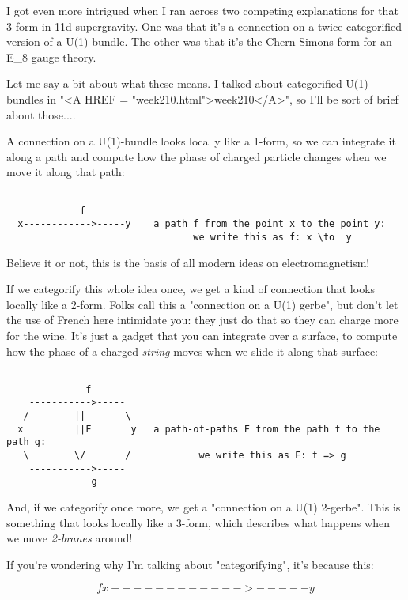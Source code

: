I got even more intrigued when I ran across two competing 
explanations for that 3-form in 11d supergravity.  One was 
that it's a connection on a twice categorified version of 
a U(1) bundle.  The other was that it's the Chern-Simons
form for an E_{8} gauge theory. 

Let me say a bit about what these means.  I talked about categorified
U(1) bundles in "<A HREF = "week210.html">week210</A>", so
I'll be sort of brief about those....

A connection on a U(1)-bundle looks locally like a 1-form, 
so we can integrate it along a path and compute how the 
phase of charged particle changes when we move it along that 
path:


\begin{verbatim}

             f
  x------------>-----y    a path f from the point x to the point y:
                                 we write this as f: x \to  y

\end{verbatim}
    
Believe it or not, this is the basis of all modern ideas on 
electromagnetism!

If we categorify this whole idea once, we get a kind of
connection that looks locally like a 2-form.  Folks call this
a "connection on a U(1) gerbe", but don't let the use of French 
here intimidate you: they just do that so they can charge more 
for the wine.  It's just a gadget that you can integrate over 
a surface, to compute how the phase of a charged \emph{string} moves 
when we slide it along that surface:


\begin{verbatim}

              f
    ----------->-----
   /        ||       \
  x         ||F       y   a path-of-paths F from the path f to the path g:
   \        \/       /            we write this as F: f => g
    ----------->-----
               g
\end{verbatim}
    
And, if we categorify once more, we get a "connection on a 
U(1) 2-gerbe".  This is something that looks locally like a 
3-form, which describes what happens when we move \emph{2-branes} 
around!

If you're wondering why I'm talking about "categorifying", 
it's because this:


$$

             f
  x------------>-----y    
$$
    
